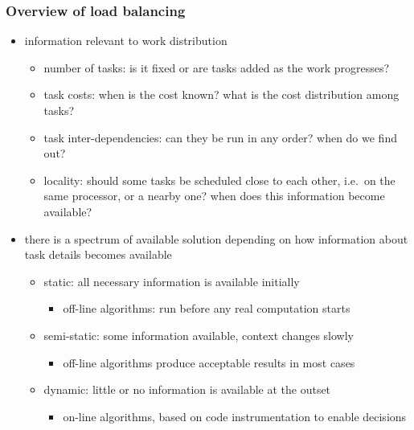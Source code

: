 \begin{frame}[fragile]
%
  \frametitle{Overview of load balancing}
%
  \begin{itemize}
%
  \item information relevant to work distribution
    \begin{itemize}
    \item number of tasks: is it fixed or are tasks added as the work progresses?
    \item task costs: when is the cost known? what is the cost distribution among tasks?
    \item task inter-dependencies: can they be run in any order? when do we find out?
    \item locality: should some tasks be scheduled close to each other, i.e.~on the same
      processor, or a nearby one? when does this information become available?
    \end{itemize}
%
    \item there is a spectrum of available solution depending on how information about task
      details becomes available
      \begin{itemize}
      \item static: all necessary information is available initially
        \begin{itemize}
        \item off-line algorithms: run before any real computation starts
        \end{itemize}
      \item semi-static: some information available, context changes slowly
        \begin{itemize}
        \item off-line algorithms produce acceptable results in most cases
        \end{itemize}
      \item dynamic: little or no information is available at the outset
        \begin{itemize}
        \item on-line algorithms, based on code instrumentation to enable decisions
        \end{itemize}
      \end{itemize}
%
  \end{itemize}
%
\end{frame}

